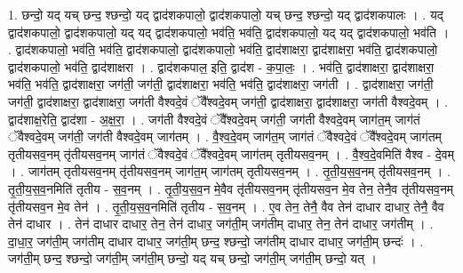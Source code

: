 \documentclass[17pt]{extarticle}
\begin{document}
1. छन्दो॒ यद् यच् छन्द॒ श्छन्दो॒ यद् द्वाद॑शकपालो॒ द्वाद॑शकपालो॒ यच् छन्द॒ श्छन्दो॒ यद् द्वाद॑शकपालः । . यद् द्वाद॑शकपालो॒ द्वाद॑शकपालो॒ यद् यद् द्वाद॑शकपालो॒ भव॑ति॒ भव॑ति॒ द्वाद॑शकपालो॒ यद् यद् द्वाद॑शकपालो॒ भव॑ति । . द्वाद॑शकपालो॒ भव॑ति॒ भव॑ति॒ द्वाद॑शकपालो॒ द्वाद॑शकपालो॒ भव॑ति॒ द्वाद॑शाक्षरा॒ द्वाद॑शाक्षरा॒ भव॑ति॒ द्वाद॑शकपालो॒ द्वाद॑शकपालो॒ भव॑ति॒ द्वाद॑शाक्षरा । . द्वाद॑शकपाल॒ इति॒ द्वाद॑श - क॒पा॒लः॒ । . भव॑ति॒ द्वाद॑शाक्षरा॒ द्वाद॑शाक्षरा॒ भव॑ति॒ भव॑ति॒ द्वाद॑शाक्षरा॒ जग॑ती॒ जग॑ती॒ द्वाद॑शाक्षरा॒ भव॑ति॒ भव॑ति॒ द्वाद॑शाक्षरा॒ जग॑ती । . द्वाद॑शाक्षरा॒ जग॑ती॒ जग॑ती॒ द्वाद॑शाक्षरा॒ द्वाद॑शाक्षरा॒ जग॑ती वैश्वदे॒वं ॅवै᳚श्वदे॒वम् जग॑ती॒ द्वाद॑शाक्षरा॒ द्वाद॑शाक्षरा॒ जग॑ती वैश्वदे॒वम् । . द्वाद॑शाक्ष॒रेति॒ द्वाद॑शा - अ॒क्ष॒रा॒ । . जग॑ती वैश्वदे॒वं ॅवै᳚श्वदे॒वम् जग॑ती॒ जग॑ती वैश्वदे॒वम् जाग॑त॒म् जाग॑तं ॅवैश्वदे॒वम् जग॑ती॒ जग॑ती वैश्वदे॒वम् जाग॑तम् । . वै॒श्व॒दे॒वम् जाग॑त॒म् जाग॑तं ॅवैश्वदे॒वं ॅवै᳚श्वदे॒वम् जाग॑तम् तृतीयसव॒नम् तृ॑तीयसव॒नम् जाग॑तं ॅवैश्वदे॒वं ॅवै᳚श्वदे॒वम् जाग॑तम् तृतीयसव॒नम् । . वै॒श्व॒दे॒वमिति॑ वैश्व - दे॒वम् । . जाग॑तम् तृतीयसव॒नम् तृ॑तीयसव॒नम् जाग॑त॒म् जाग॑तम् तृतीयसव॒नम् । . तृ॒ती॒य॒स॒व॒नम् तृ॑तीयसव॒नम् । . तृ॒ती॒य॒स॒व॒नमिति॑ तृतीय - स॒व॒नम् । . तृ॒ती॒य॒स॒व॒न मे॒वैव तृ॑तीयसव॒नम् तृ॑तीयसव॒न मे॒व तेन॒ तेनै॒व तृ॑तीयसव॒नम् तृ॑तीयसव॒न मे॒व तेन॑ । . तृ॒ती॒य॒स॒व॒नमिति॑ तृतीय - स॒व॒नम् । . ए॒व तेन॒ तेनै॒ वैव तेन॑ दाधार दाधार॒ तेनै॒ वैव तेन॑ दाधार । . तेन॑ दाधार दाधार॒ तेन॒ तेन॑ दाधार॒ जग॑ती॒म् जग॑तीम् दाधार॒ तेन॒ तेन॑ दाधार॒ जग॑तीम् । . दा॒धा॒र॒ जग॑ती॒म् जग॑तीम् दाधार दाधार॒ जग॑ती॒म् छन्द॒ श्छन्दो॒ जग॑तीम् दाधार दाधार॒ जग॑ती॒म् छन्दः॑ । . जग॑ती॒म् छन्द॒ श्छन्दो॒ जग॑ती॒म् जग॑ती॒म् छन्दो॒ यद् यच् छन्दो॒ जग॑ती॒म् जग॑ती॒म् छन्दो॒ यत् । \newline
\end{document}
